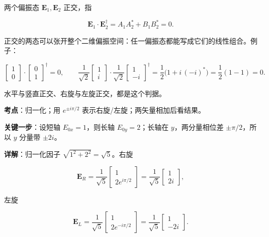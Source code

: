 \documentclass[11pt]{ctexart}
\begin{document}


两个偏振态 $\mathbf{E}_1,\mathbf{E}_2$ 正交，指

\[
\mathbf{E}_1\cdot\mathbf{E}_2^\dagger
=A_1A_2^*+B_1B_2^*=0 .
\]

正交的两态可以张开整个二维偏振空间：任一偏振态都能写成它们的线性组合。例子：

\[
\begin{bmatrix}1\\0\end{bmatrix}\cdot\begin{bmatrix}0\\1\end{bmatrix}^\dagger=0,
\qquad
\frac{1}{\sqrt2}\begin{bmatrix}1\\ i\end{bmatrix}\cdot
\frac{1}{\sqrt2}\begin{bmatrix}1\\ -i\end{bmatrix}^\dagger
=\frac12\bigl(1+i\,(-i)^*\bigr)=\frac12(1-1)=0 .
\]

水平与竖直正交、右旋与左旋正交，都是这个判据。


\qbreak
{}

\textbf{考点}：归一化；用 $e^{\pm i\pi/2}$ 表示右旋/左旋；两矢量相加后看结果。

\textbf{关键一步}：设短轴 $E_{0x}=1$，则长轴 $E_{0y}=2$；长轴在 $y$，两分量相位差 $\pm\pi/2$，所以 $y$ 分量带 $\pm2i$。

\textbf{详解}：归一化因子 $\sqrt{1^2+2^2}=\sqrt5$。右旋

\[
\mathbf{E}_R=\frac{1}{\sqrt5}\begin{bmatrix}1\\ 2e^{i\pi/2}\end{bmatrix}
=\frac{1}{\sqrt5}\begin{bmatrix}1\\ 2i\end{bmatrix},
\]

左旋

\[
\mathbf{E}_L=\frac{1}{\sqrt5}\begin{bmatrix}1\\ 2e^{-i\pi/2}\end{bmatrix}
=\frac{1}{\sqrt5}\begin{bmatrix}1\\ -2i\end{bmatrix}.
\]
\end{document}
